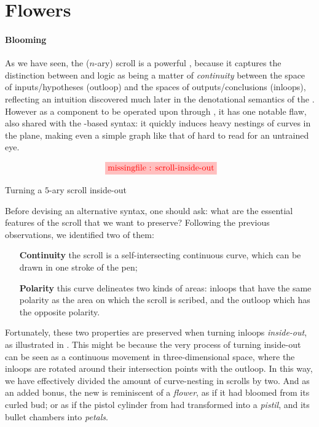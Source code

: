 \section{Flowers}

\paragraph{Blooming}

As we have seen, the ($n$-ary) scroll is a powerful , because it captures
the distinction between  and  logic as being a matter of
\emph{continuity} between the space of inputs/hypotheses (outloop) and the
spaces of outputs/conclusions (inloops), reflecting an intuition discovered much
later in the denotational semantics of the . However as a
 component to be operated upon through , it has
one notable flaw, also shared with the  -based syntax: it quickly
induces heavy nestings of curves in the plane, making even a simple graph like
that of  hard to read for an untrained eye.

\begin{marginfigure}
  $$
  \tikzfig{1}{0.4}{scroll-inside-out}
  $$
  \caption{Turning a $5$-ary scroll inside-out}
\end{marginfigure}

Before devising an alternative syntax, one should ask: what are the essential
features of the scroll that we want to preserve? Following the previous
observations, we identified two of them:
\begin{itemize}
  \item[\textbf{Continuity}] the scroll is a self-intersecting continuous curve,
  which can be drawn in one stroke of the pen;
  \item[\textbf{Polarity}] this curve delineates two kinds of areas: inloops that have
  the same polarity as the area on which the scroll is scribed, and the outloop
  which has the opposite polarity.
\end{itemize}

Fortunately, these two properties are preserved when turning inloops
\emph{inside-out}, as illustrated in . This might be
because the very process of turning inside-out can be seen as a continuous
movement in three-dimensional space, where the inloops are rotated around their
intersection points with the outloop. In this way, we have effectively divided
the amount of curve-nesting in scrolls by two. And as an added bonus, the new
 is reminiscent of a \emph{flower}, as if it had bloomed from its curled
bud; or as if the pistol cylinder from  had transformed into
a \emph{pistil}, and its bullet chambers into \emph{petals}.

